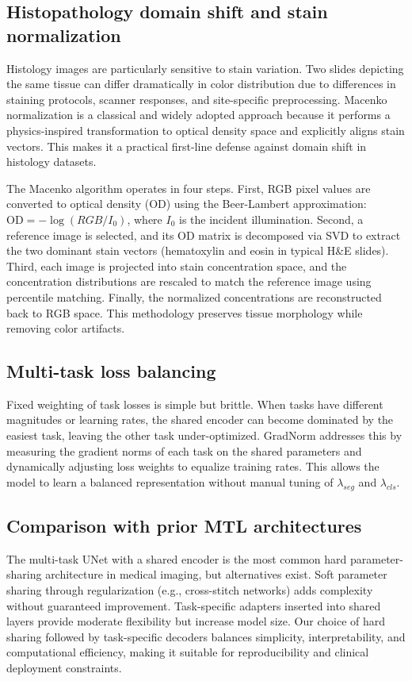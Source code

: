 \documentclass[conference,a4paper]{IEEEtran}
\begin{document}
\subsection{Histopathology domain shift and stain normalization}
Histology images are particularly sensitive to stain variation. Two slides depicting the same tissue can differ dramatically in color distribution due to differences in staining protocols, scanner responses, and site-specific preprocessing. Macenko normalization is a classical and widely adopted approach because it performs a physics-inspired transformation to optical density space and explicitly aligns stain vectors. This makes it a practical first-line defense against domain shift in histology datasets.

The Macenko algorithm operates in four steps. First, RGB pixel values are converted to optical density (OD) using the Beer-Lambert approximation: $\text{OD} = -\log(RGB / I_0)$, where $I_0$ is the incident illumination. Second, a reference image is selected, and its OD matrix is decomposed via SVD to extract the two dominant stain vectors (hematoxylin and eosin in typical H\&E slides). Third, each image is projected into stain concentration space, and the concentration distributions are rescaled to match the reference image using percentile matching. Finally, the normalized concentrations are reconstructed back to RGB space. This methodology preserves tissue morphology while removing color artifacts.

\subsection{Multi-task loss balancing}
Fixed weighting of task losses is simple but brittle. When tasks have different magnitudes or learning rates, the shared encoder can become dominated by the easiest task, leaving the other task under-optimized. GradNorm addresses this by measuring the gradient norms of each task on the shared parameters and dynamically adjusting loss weights to equalize training rates. This allows the model to learn a balanced representation without manual tuning of $\lambda_{seg}$ and $\lambda_{cls}$.

\subsection{Comparison with prior MTL architectures}
The multi-task UNet with a shared encoder is the most common hard parameter-sharing architecture in medical imaging, but alternatives exist. Soft parameter sharing through regularization (e.g., cross-stitch networks) adds complexity without guaranteed improvement. Task-specific adapters inserted into shared layers provide moderate flexibility but increase model size. Our choice of hard sharing followed by task-specific decoders balances simplicity, interpretability, and computational efficiency, making it suitable for reproducibility and clinical deployment constraints.
\end{document}

